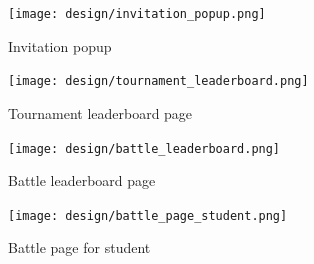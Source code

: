 \begin{figure} [H]
    \begin{center}
        \texttt{[image: design/invitation\_popup.png]}
        \caption{Invitation popup}
        \label{fig: invitation_popup}
    \end{center}
\end{figure}

\begin{figure} [H]
    \begin{center}
        \texttt{[image: design/tournament\_leaderboard.png]}
        \caption{Tournament leaderboard page}
        \label{fig: tournament_leaderboard}
    \end{center}
\end{figure}

\begin{figure} [H]
    \begin{center}
        \texttt{[image: design/battle\_leaderboard.png]}
        \caption{Battle leaderboard page}
        \label{fig: battle_leaderboard}
    \end{center}
\end{figure}

\begin{figure} [H]
    \begin{center}
        \texttt{[image: design/battle\_page\_student.png]}
        \caption{Battle page for student}
        \label{fig: battle_page_student}
    \end{center}
\end{figure}